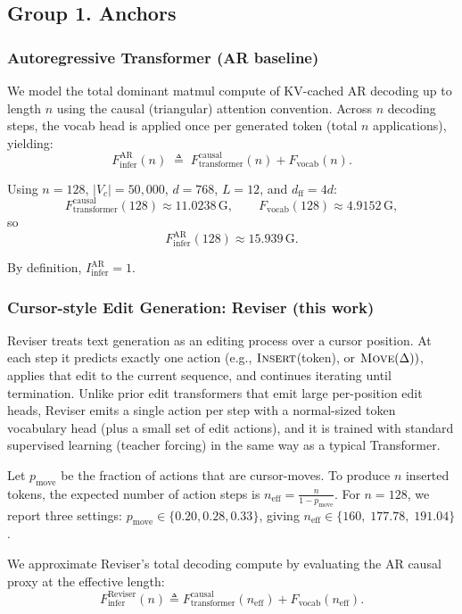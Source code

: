 \documentclass[11pt]{article}
\newcommand{\G}{\mathrm{G}} %
\begin{document}
\subsection{Group 1. Anchors}
\subsubsection{Autoregressive Transformer (AR baseline)}
We model the total dominant matmul compute of KV-cached AR decoding up to length $n$ using the causal (triangular) attention convention.
Across $n$ decoding steps, the vocab head is applied once per generated token (total $n$ applications), yielding:
\[
F_{\text{infer}}^{\text{AR}}(n)
\;\triangleq\;
F_{\text{transformer}}^{\text{causal}}(n) + F_{\text{vocab}}(n).
\]

Using $n=128$, $|V_c|=50{,}000$, $d=768$, $L=12$, and $d_{\text{ff}}=4d$:
\[
F_{\text{transformer}}^{\text{causal}}(128)\approx \num{11.0238}\,\G,
\qquad
F_{\text{vocab}}(128)\approx \num{4.9152}\,\G,
\]
so
\[
F_{\text{infer}}^{\text{AR}}(128)\approx \num{15.939}\,\G.
\]

By definition, $I_{\text{infer}}^{\text{AR}}=1$.

\subsubsection{Cursor-style Edit Generation: Reviser (this work)}
\label{app:reviser_flops}

Reviser treats text generation as an editing process over a cursor position. At each step it predicts exactly one action (e.g., $\textsc{Insert}$(token), or $\textsc{Move}(\Delta))$, applies that edit to the current sequence, and continues iterating until termination. Unlike prior edit transformers that emit large per-position edit heads, Reviser emits a single action per step with a normal-sized token vocabulary head (plus a small set of edit actions), and it is trained with standard supervised learning (teacher forcing) in the same way as a typical Transformer.

Let $p_{\text{move}}$ be the fraction of actions that are cursor-moves. To produce $n$ inserted tokens, the expected number of action steps is
$n_{\text{eff}}=\frac{n}{1-p_{\text{move}}}$.
For $n=128$, we report three settings: $p_{\text{move}}\in\{0.20,0.28,0.33\}$, giving
$n_{\text{eff}}\in\{160,\;177.78,\;191.04\}$.

We approximate Reviser's total decoding compute by evaluating the AR causal proxy at the effective length:
\[
F_{\text{infer}}^{\text{Reviser}}(n)\triangleq
F_{\text{transformer}}^{\text{causal}}(n_{\text{eff}})+F_{\text{vocab}}(n_{\text{eff}}).
\]
\end{document}
